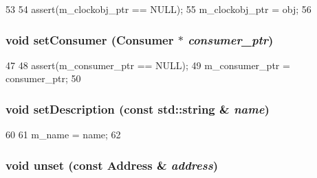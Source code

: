 \begin{DoxyCode}
53     {
54         assert(m_clockobj_ptr == NULL);
55         m_clockobj_ptr = obj;
56     }
\end{DoxyCode}
\hypertarget{classTimerTable_a8487c37680239f103e21ada9acf1726d}{
\subsubsection[{setConsumer}]{\setlength{\rightskip}{0pt plus 5cm}void setConsumer ({\bf Consumer} $\ast$ {\em consumer\_\-ptr})}}
\label{classTimerTable_a8487c37680239f103e21ada9acf1726d}



\begin{DoxyCode}
47     {
48         assert(m_consumer_ptr == NULL);
49         m_consumer_ptr = consumer_ptr;
50     }
\end{DoxyCode}
\hypertarget{classTimerTable_a9cdbe64eebafb111a124edec55ed2340}{
\subsubsection[{setDescription}]{\setlength{\rightskip}{0pt plus 5cm}void setDescription (const std::string \& {\em name})}}
\label{classTimerTable_a9cdbe64eebafb111a124edec55ed2340}



\begin{DoxyCode}
60     {
61         m_name = name;
62     }
\end{DoxyCode}
\hypertarget{classTimerTable_ac54af1e5e959f0027f639c741609ab0a}{
\subsubsection[{unset}]{\setlength{\rightskip}{0pt plus 5cm}void unset (const {\bf Address} \& {\em address})}}
\label{classTimerTable_ac54af1e5e959f0027f639c741609ab0a}




